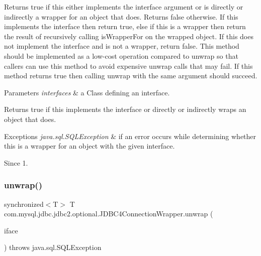 Returns true if this either implements the interface argument or is directly or indirectly a wrapper for an object that does. Returns false otherwise. If this implements the interface then return true, else if this is a wrapper then return the result of recursively calling {\ttfamily is\+Wrapper\+For} on the wrapped object. If this does not implement the interface and is not a wrapper, return false. This method should be implemented as a low-\/cost operation compared to {\ttfamily unwrap} so that callers can use this method to avoid expensive {\ttfamily unwrap} calls that may fail. If this method returns true then calling {\ttfamily unwrap} with the same argument should succeed.


\begin{DoxyParams}{Parameters}
{\em interfaces} & a Class defining an interface. \\
\hline
\end{DoxyParams}
\begin{DoxyReturn}{Returns}
true if this implements the interface or directly or indirectly wraps an object that does. 
\end{DoxyReturn}

\begin{DoxyExceptions}{Exceptions}
{\em java.\+sql.\+S\+Q\+L\+Exception} & if an error occurs while determining whether this is a wrapper for an object with the given interface. \\
\hline
\end{DoxyExceptions}
\begin{DoxySince}{Since}
1. 
\end{DoxySince}
\mbox{\label{classcom_1_1mysql_1_1jdbc_1_1jdbc2_1_1optional_1_1_j_d_b_c4_connection_wrapper_aad3da1c38431039875192348e78b7847}} 
\subsubsection{\texorpdfstring{unwrap()}{unwrap()}}
{\footnotesize\ttfamily synchronized$<$T$>$ T com.\+mysql.\+jdbc.\+jdbc2.\+optional.\+J\+D\+B\+C4\+Connection\+Wrapper.\+unwrap (\begin{DoxyParamCaption}\item[{java.\+lang.\+Class$<$ T $>$}]{iface }\end{DoxyParamCaption}) throws java.\+sql.\+S\+Q\+L\+Exception}

